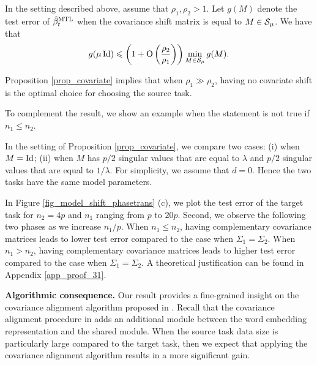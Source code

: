 \begin{proposition}\label{prop_covariate}
	In the setting described above, assume that $\rho_1, \rho_2>1$.
	Let $g(M)$ denote the test error of $\hat{\beta}_t^{\text{MTL}}$ when the covariance shift matrix is equal to $M\in\mathcal{S}_{\mu}$.
	We have that \[ g(\mu\operatorname{Id}) \leqslant \left({1+ \operatorname{O}\left(\frac{\rho_2}{\rho_1}  \right)}\right) \min_{M\in\mathcal{S}_{\mu}} g(M). \]
\end{proposition}
Proposition \ref{prop_covariate} implies that when $\rho_1\gg \rho_2$, having no covariate shift is the optimal choice for choosing the source task.

\todo{} To complement the result, we show an example when the statement is not true if $n_1 \le n_2$.
\begin{example}\label{ex_complement}
	In the setting of Proposition \ref{prop_covariate}, we compare two cases: (i) when $M = \operatorname{Id}$; (ii) when $M$ has $p/2$ singular values that are equal to $\lambda$ and $p/2$ singular values that are equal to $1 / \lambda$.
	For simplicity, we assume that $d = 0$.
	Hence the two tasks have the same model parameters.

	In Figure \ref{fig_model_shift_phasetrans} (c), we plot the test error of the target task for $n_2 = 4p$ and $n_1$ ranging from $p$ to $20p$.
	Second, we observe the following two phases as we increase $n_1 / p$.
	When $n_1 \le n_2$, having complementary covariance matrices leads to lower test error compared to the case when $\Sigma_1 = \Sigma_2$.
	When $n_1 > n_2$, having complementary covariance matrices leads to higher test error compared to the case when $\Sigma_1 = \Sigma_2$.
	A theoretical justification can be found in Appendix \ref{app_proof_31}.
\end{example}

\textbf{Algorithmic consequence.}
Our result provides a fine-grained insight on the covariance alignment algorithm proposed in \cite{WZR20}.
Recall that the covariance alignment procedure in \cite{WZR20} adds an additional module between the word embedding representation and the shared module.
When the source task data size is particularly large compared to the target task, then we expect that applying the covariance alignment algorithm results in a more significant gain.